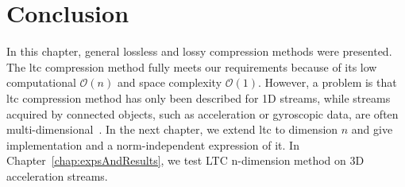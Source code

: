 \section{Conclusion}


In this chapter, general lossless and lossy compression methods were presented.
The \acrshort{ltc} compression method fully meets our requirements because of
its low computational $\mathcal{O}(n)$ and space complexity $\mathcal{O}(1)$.
However, a problem is that \acrshort{ltc} compression method has only been
described for 1D streams, while streams acquired by connected objects, such as
acceleration or gyroscopic data, are often multi-dimensional~\cite{li2018multi}.
In the next chapter, we extend \acrshort{ltc} to dimension $n$ and give
implementation and a norm-independent expression of it. In
Chapter~\ref{chap:expsAndResults}, we test LTC n-dimension method on 3D
acceleration streams.  
